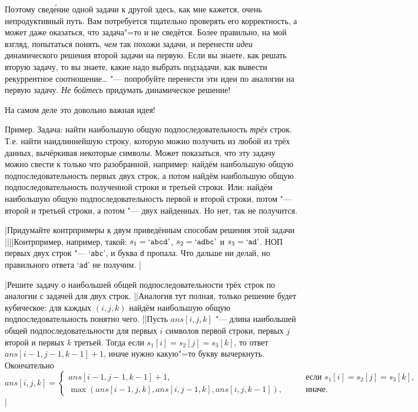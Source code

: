 Поэтому свед\'{е}ние одной задачи к другой здесь, как мне кажется, очень непродуктивный путь. Вам 
потребуется тщательно проверять его корректность, а может даже оказаться, что задача"=то и не 
сведётся. Более правильно, на мой взгляд, попытаться понять, \textit{чем} так похожи задачи, и перенести 
\textit{идеи} динамического решения второй задачи на первую. Если вы знаете, как решать вторую 
задачу, то вы знаете, какие надо выбрать подзадачи, как вывести рекуррентное соотношение\dots{} "--- 
попробуйте перенести эти идеи по аналогии на первую задачу. \textit{Не бойтесь} придумать динамическое 
решение!

На самом деле это довольно важная идея!

Пример. Задача: найти наибольшую общую подпоследовательность \textit{трёх} строк. Т.е. найти 
наидлиннейшую строку, которую можно получить из любой из трёх данных, вычёркивая некоторые символы. 
Может показаться, что эту задачу можно свести к только что разобранной, например: найдём наибольшую 
общую подпоследовательность первых двух строк, а потом найдём наибольшую общую 
подпоследовательность полученной строки и третьей строки. Или: найдём наибольшую общую 
подпоследовательность первой и второй строки, потом "--- второй и третьей строки, а потом "--- двух 
найденных. Но нет, так не получится.

\task|Придумайте контрпримеры к двум приведённым способам решения этой задачи
||||Контрпример, например, такой: $s_1=\mbox{`\texttt{abcd}'}$, $s_2=\mbox{`\texttt{adbc}'}$ и 
$s_3=\mbox{`\texttt{ad}'}$. НОП первых двух строк "--- `\texttt{abc}', и буква \texttt{d} пропала. 
Что дальше ни делай, но правильного ответа `\texttt{ad}' не получим.
|

\task|Решите задачу о наибольшей общей подпоследовательности трёх строк по аналогии с задачей для 
двух строк.
||Аналогия тут полная, только решение будет кубическое: для каждых $(i,j,k)$ 
найдём наибольшую общую подпоследовательность понятно чего.
||Пусть $ans[i,j,k]$ "--- длина наибольшей общей подпоследовательности для первых $i$ символов 
первой строки, первых $j$ второй и первых $k$ третьей. Тогда если $s_1[i]=s_2[j]=s_3[k]$, то ответ 
$ans[i-1,j-1,k-1]+1$, иначе нужно какую"=то букву вычеркнуть. Окончательно
$$
ans[i,j,k]=\left\{\begin{array}{ll}
ans[i-1,j-1,k-1]+1,\qquad&\mbox{если }s_1[i]=s_2[j]=s_3[k],\\
\max(ans[i-1,j,k],ans[i,j-1,k],ans[i,j,k-1]),\qquad&\mbox{иначе.}
\end{array}\right.
$$
|

